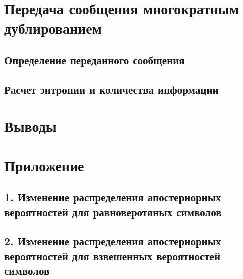 \section{Передача сообщения многократным дублированием}

\subsection{Определение переданного сообщения}

\subsection{Расчет энтропии и количества информации}

\section{Выводы}

\section*{Приложение}

\subsection*{1. Изменение распределения апостериорных вероятностей для равноверотяных символов}


\subsection*{2. Изменение распределения апостериорных вероятностей для взвешенных вероятностей символов}



